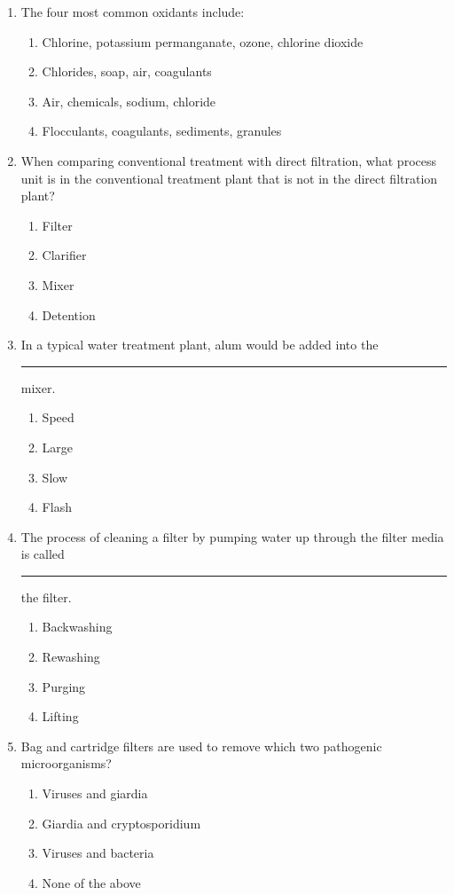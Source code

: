 \documentclass{article}
\begin{document}
\begin{enumerate}
\item The four most common oxidants include:
\begin{enumerate}
\item Chlorine, potassium permanganate, ozone, chlorine dioxide
\item Chlorides, soap, air, coagulants
\item Air, chemicals, sodium, chloride
\item Flocculants, coagulants, sediments, granules
\end{enumerate}

\item When comparing conventional treatment with direct filtration, what process unit is in the conventional treatment plant that is not in the direct filtration plant?
\begin{enumerate}
\item Filter
\item Clarifier
\item Mixer
\item Detention
\end{enumerate}

\item In a typical water treatment plant, alum would be added into the \rule{1cm}{0.5pt}  mixer.
\begin{enumerate}
\item Speed
\item Large
\item Slow
\item Flash
\end{enumerate}

\item The process of cleaning a filter by pumping water up through the filter media is called \rule{1cm}{0.5pt}  the filter.
\begin{enumerate}
\item Backwashing
\item Rewashing
\item Purging
\item Lifting
\end{enumerate}

\item Bag and cartridge filters are used to remove which two pathogenic microorganisms?
\begin{enumerate}
\item Viruses and giardia
\item Giardia and cryptosporidium
\item Viruses and bacteria
\item None of the above
\end{enumerate}


\end{enumerate}
\end{document}
